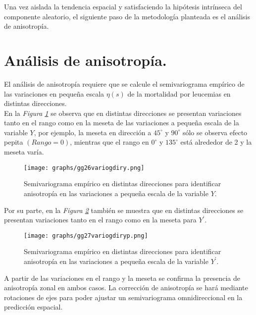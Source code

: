 \documentclass[11pt, oneside]{book}
\begin{document}
Una vez aislada la tendencia espacial y satisfaciendo la hipótesis intrínseca del componente aleatorio, el siguiente paso de la metodología planteada es el análisis de anisotropía.\\

\bigskip

\section{Análisis de anisotropía.}
El análisis de anisotropía requiere que se calcule el semivariograma empírico de las variaciones en pequeña escala $\eta(s)$ de la mortalidad por leucemias en distintas direcciones.\\ 

En la \emph{Figura \ref{fig26.var}} se observa que en distintas direcciones se presentan variaciones tanto en el rango como en la meseta de las variaciones a pequeña escala de la variable $Y$, por ejemplo, la meseta en dirección a $45^{\circ}$ y $90^{\circ}$ sólo se observa efecto pepita $(Rango = 0)$, mientras que el rango en $0^{\circ}$ y $135^{\circ}$ está alrededor de 2 y la meseta varía.\\

\begin{figure}[!ht]
    \centering
    \texttt{[image: graphs/gg26variogdiry.png]}
  \caption{Semivariograma empírico en distintas direcciones para identificar anisotropía en las variaciones a pequeña escala de la variable $Y$.}
  \label{fig26.var}
\end{figure}

Por su parte, en la \emph{Figura \ref{fig27.var}} también se muestra que en distintas direcciones se presentan variaciones tanto en el rango como en la meseta para $Y^{'}$.\\

\begin{figure}[!ht]
    \centering
    \texttt{[image: graphs/gg27variogdiryp.png]}
  \caption{Semivariograma empírico en distintas direcciones para identificar anisotropía en las variaciones a pequeña escala de la variable $Y^{'}$.}
  \label{fig27.var}
\end{figure}


A partir de las variaciones en el rango y la meseta se confirma la presencia de anisotropía zonal en ambos casos. La corrección de anisotropía se hará mediante rotaciones de ejes para poder ajustar un semivariograma omnidireccional en la predicción espacial.\\
\end{document}
